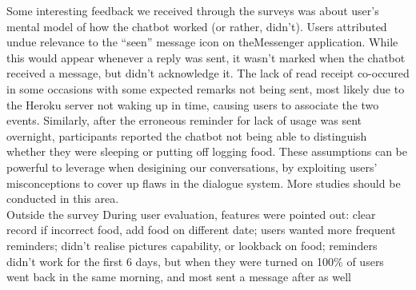 Some interesting feedback we received through the surveys was about user's mental model of how the chatbot worked (or rather, didn't). Users attributed undue relevance to the ``seen'' message icon on theMessenger application. While this would appear whenever a reply was sent, it wasn't marked when the chatbot received a message, but didn't acknowledge it. The lack of read receipt co-occured in some occasions with some expected remarks not being sent, most likely due to the Heroku server not waking up in time, causing users to associate the two events. Similarly, after the erroneous reminder for lack of usage was sent overnight, participants reported the chatbot not being able to distinguish whether they were sleeping or putting off logging food. These assumptions can be powerful to leverage when desigining our conversations, by exploiting users' misconceptions to cover up flaws in the dialogue system. More studies should be conducted in this area. \\


Outside the survey During user evaluation, features were pointed out: clear record if incorrect food, add food on different date; users wanted more frequent reminders; didn't realise pictures capability, or lookback on food; reminders didn't work for the first 6 days, but when they were turned on 100\% of users went back in the same morning, and most sent a message after as well

